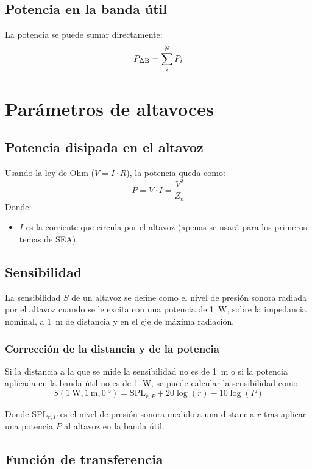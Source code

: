 \documentclass[a4paper, 8pt]{extarticle}
\begin{document}
\begin{multicols}{3}
    \subsection{Potencia en la banda útil}
    La potencia se puede sumar directamente:
    \[
        P_{\Delta \textup{B}} = \sum_{i}^{N} P_i
    \]

    \section{Parámetros de altavoces}
    \subsection{Potencia disipada en el altavoz}
    Usando la ley de Ohm ($V=I \cdot R$), la potencia queda como:
    \[ P = V \cdot I = \frac{V^2}{Z_n}\]
    \color{gray}Donde:
    \begin{itemize}
        \item $I$ es la corriente que circula por el altavoz (apenas se usará para los primeros temas de SEA).
    \end{itemize}\color{black}

    \subsection{Sensibilidad}
    La sensibilidad $S$ de un altavoz se define como el nivel de presión sonora radiada por el altavoz cuando se le excita con una potencia de \qty{1}{\watt}, sobre la impedancia nominal, a \qty{1}{\meter} de distancia y en el eje de máxima radiación.

    \subsubsection{Corrección de la distancia y de la potencia}
    Si la distancia a la que se mide la sensibilidad no es de \qty{1}{\meter} o si la potencia aplicada en la banda útil no es de \qty{1}{\watt}, se puede calcular la sensibilidad como:
    \[
        S \left( \qty{1}{\watt }, \qty{1}{\meter}, \qty{0}{\degree }  \right) = \text{SPL}_{r,P} + 20 \log \left( r \right) - 10 \log \left( P \right)
    \]

    \color{gray}Donde $\text{SPL}_{r,P}$ es el nivel de presión sonora medido a una distancia $r$ tras aplicar una potencia $P$ al altavoz en la banda útil.\color{black}

    \subsection{Función de transferencia}


\end{multicols}
\end{document}
